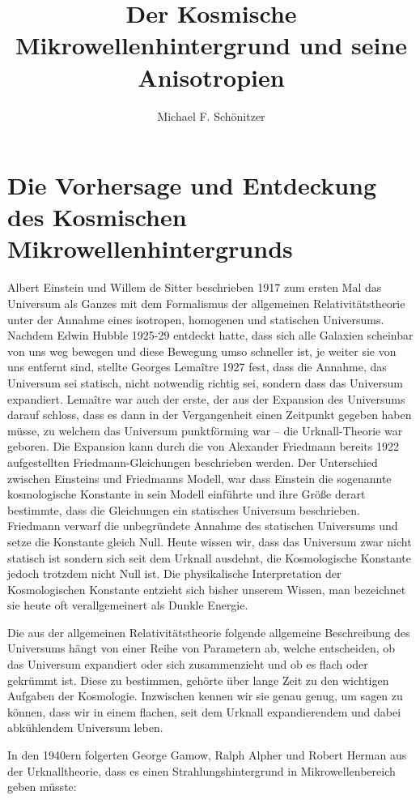 \documentclass[10pt,a4paper]{article}
\author{Michael F. Schönitzer}
\title{Der Kosmische Mikrowellenhintergrund und seine Anisotropien}
\begin{document}
\maketitle

\section{Die Vorhersage und Entdeckung des Kosmischen Mikrowellenhintergrunds}
Albert Einstein und Willem de Sitter beschrieben 1917 zum ersten Mal das Universum als Ganzes mit dem Formalismus der allgemeinen Relativitätstheorie unter der Annahme eines isotropen, homogenen und statischen Universums.
Nachdem Edwin Hubble 1925-29 entdeckt hatte, dass sich alle Galaxien scheinbar von uns weg bewegen und diese Bewegung umso schneller ist, je weiter sie von uns entfernt sind, stellte Georges Lemaître 1927 fest, dass die Annahme, das Universum sei statisch, nicht notwendig richtig sei, sondern dass das Universum expandiert. Lemaître war auch der erste, der aus der Expansion des Universums darauf schloss, dass es dann in der Vergangenheit einen Zeitpunkt gegeben haben müsse, zu welchem das Universum punktförming war -- die Urknall-Theorie war geboren.
Die Expansion kann durch die von Alexander Friedmann bereits 1922 aufgestellten Friedmann-Gleichungen beschrieben werden.
Der Unterschied zwischen Einsteins und Friedmanns Modell, war dass Einstein die sogenannte kosmologische Konstante in sein Modell einführte und ihre Größe derart bestimmte, dass die Gleichungen ein statisches Universum beschrieben. Friedmann verwarf die unbegründete Annahme des statischen Universums und setze die Konstante gleich Null.
Heute wissen wir, dass das Universum zwar nicht statisch ist sondern sich seit dem Urknall ausdehnt, die Kosmologische Konstante jedoch trotzdem nicht Null ist.
Die physikalische Interpretation der Kosmologischen Konstante entzieht sich bisher unserem Wissen, man bezeichnet sie heute oft verallgemeinert als Dunkle Energie.

Die aus der allgemeinen Relativitätstheorie folgende allgemeine Beschreibung des Universums hängt von einer Reihe von Parametern ab, welche entscheiden, ob das Universum expandiert oder sich zusammenzieht und ob es flach oder gekrümmt ist. Diese zu bestimmen, gehörte über lange Zeit zu den wichtigen Aufgaben der Kosmologie. Inzwischen kennen wir sie genau genug, um sagen zu können, dass wir in einem flachen, seit dem Urknall expandierendem und dabei abkühlendem Universum leben.

In den 1940ern folgerten George Gamow, Ralph Alpher und Robert Herman aus der Urknalltheorie, dass es einen Strahlungshintergrund in Mikrowellenbereich geben müsste:
\end{document}
